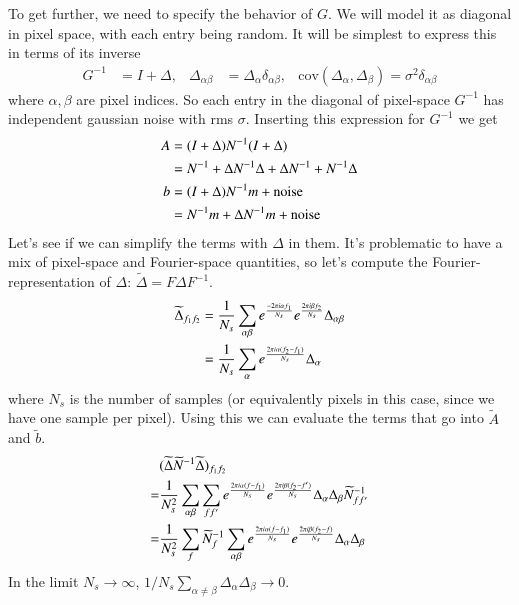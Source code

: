 \documentclass{aa}
\begin{document}
To get further, we need to specify the behavior
of $G$. We will model it as diagonal in pixel space, with each entry being random.
It will be simplest to express this in terms of its inverse
\begin{align}
G^{-1} &= I + \Delta, & \Delta_{\alpha\beta} &= \Delta_\alpha \delta_{\alpha\beta}, & \text{cov}(\Delta_\alpha,\Delta_\beta) = \sigma^2 \delta_{\alpha\beta}
\end{align}
where $\alpha, \beta$ are pixel indices. So each entry in the diagonal of pixel-space $G^{-1}$
has independent gaussian noise with rms $\sigma$. Inserting this expression for $G^{-1}$ we get
\begin{align}
A &= (I+\Delta)N^{-1}(I+\Delta) \notag \\
  &= N^{-1} + \Delta N^{-1} \Delta + \Delta N^{-1} + N^{-1} \Delta \\
b &= (I+\Delta)N^{-1}m + \text{noise}\notag \\
	&= N^{-1}m + \Delta N^{-1} m + \text{noise}
\end{align}
Let's see if we can simplify the terms with $\Delta$ in them. It's problematic to have a mix
of pixel-space and Fourier-space quantities, so let's compute the Fourier-representation of
$\Delta$: $\widetilde{\Delta} = F\Delta F^{-1}$.
\begin{align}
\widetilde{\Delta}_{f_1f_2} &= \frac{1}{N_s} \sum_{\alpha\beta} e^{\frac{-2\pi i \alpha f_1}{N_s}} e^{\frac{2\pi i \beta f_2}{N_s}} \Delta_{\alpha\beta} \notag \\
&= \frac{1}{N_s} \sum_\alpha e^{\frac{2\pi i \alpha (f_2-f_1)}{N_s}} \Delta_\alpha
\end{align}
where $N_s$ is the number of samples (or equivalently pixels in this case, since we have one sample per pixel).
Using this we can evaluate the terms that go into $\widetilde{A}$ and $\widetilde{b}$.
\begin{align}
&(\widetilde\Delta \widetilde{N}^{-1} \widetilde{\Delta})_{f_1f_2} \notag \\
=&\frac{1}{N_s^2} \sum_{\alpha\beta} \sum_{ff'} e^{\frac{2\pi i \alpha (f-f_1)}{N_s}}
e^{\frac{2\pi i \beta (f_2-f')}{N_s}} \Delta_\alpha \Delta_\beta \widetilde{N}^{-1}_{ff'} \notag \\
	=& \frac{1}{N_s^2} \sum_f \widetilde{N}^{-1}_f \sum_{\alpha\beta} e^{\frac{2\pi i \alpha (f-f_1)}{N_s}}e^{\frac{2\pi i \beta (f_2-f)}{N_s}} \Delta_\alpha \Delta_\beta
\end{align}
In the limit $N_s \rightarrow \infty$, $1/N_s \sum_{\alpha\ne\beta} \Delta_\alpha\Delta_\beta \rightarrow 0$.
\end{document}
